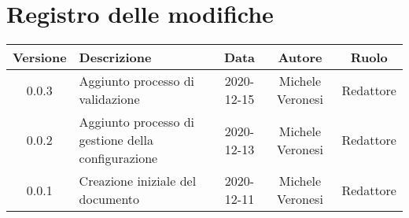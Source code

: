 \section*{Registro delle modifiche}

\begin{center}
	\begin{longtable}{|c|p{5cm}|c|c|c|}
	\hline
	\rowcolor{lighter-grayer}
	\textbf{Versione} & \textbf{Descrizione} & \textbf{Data} & \textbf{Autore} & \textbf{Ruolo} \\
	\hline
	\endfirsthead


	\hline
	0.0.3 & Aggiunto processo di validazione & 2020-12-15 & Michele Veronesi & Redattore \\
	0.0.2 & Aggiunto processo di gestione della configurazione & 2020-12-13 & Michele Veronesi & Redattore \\
	0.0.1 & Creazione iniziale del documento & 2020-12-11 & Michele Veronesi & Redattore \\
	\hline

	\end{longtable}
\end{center}